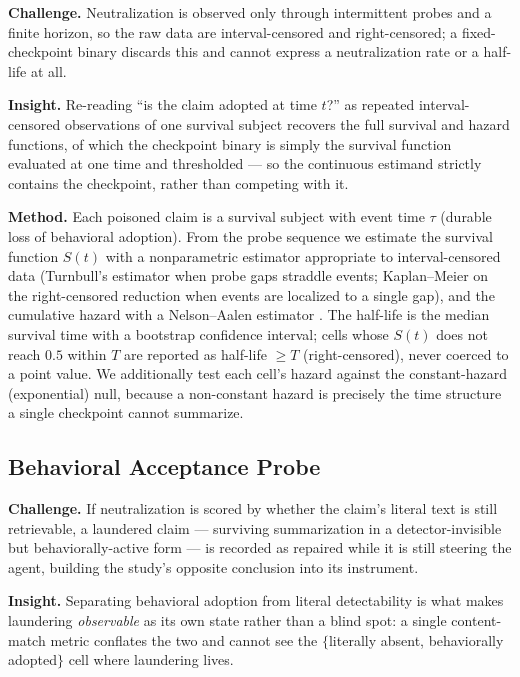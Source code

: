 \documentclass[11pt]{article}
\begin{document}
\textbf{Challenge.} Neutralization is observed only through intermittent probes and a finite horizon, so the raw data are interval-censored and right-censored; a fixed-checkpoint binary discards this and cannot express a neutralization rate or a half-life at all.

\textbf{Insight.} Re-reading ``is the claim adopted at time $t$?'' as repeated interval-censored observations of one survival subject recovers the full survival and hazard functions, of which the checkpoint binary is simply the survival function evaluated at one time and thresholded --- so the continuous estimand strictly contains the checkpoint, rather than competing with it.

\textbf{Method.} Each poisoned claim is a survival subject with event time $\tau$ (durable loss of behavioral adoption). From the probe sequence we estimate the survival function $S(t)$ with a nonparametric estimator appropriate to interval-censored data (Turnbull's estimator when probe gaps straddle events; Kaplan--Meier on the right-censored reduction when events are localized to a single gap), and the cumulative hazard with a Nelson--Aalen estimator \citep{kaplan1958nonparametric}. The half-life is the median survival time with a bootstrap confidence interval; cells whose $S(t)$ does not reach $0.5$ within $T$ are reported as half-life $\geq T$ (right-censored), never coerced to a point value. We additionally test each cell's hazard against the constant-hazard (exponential) null, because a non-constant hazard is precisely the time structure a single checkpoint cannot summarize.

\subsection*{Behavioral Acceptance Probe}

\textbf{Challenge.} If neutralization is scored by whether the claim's literal text is still retrievable, a laundered claim --- surviving summarization in a detector-invisible but behaviorally-active form --- is recorded as repaired while it is still steering the agent, building the study's opposite conclusion into its instrument.

\textbf{Insight.} Separating behavioral adoption from literal detectability is what makes laundering \emph{observable} as its own state rather than a blind spot: a single content-match metric conflates the two and cannot see the $\{$literally absent, behaviorally adopted$\}$ cell where laundering lives.
\end{document}
